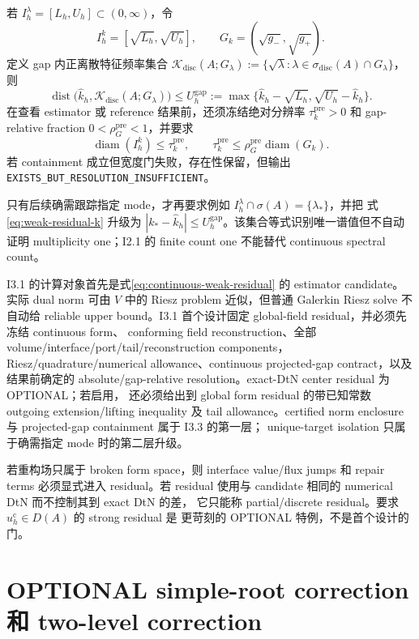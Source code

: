 \documentclass[UTF8,fontset=fandol,11pt,a4paper]{ctexart}
\begin{document}
若 $I_h^\lambda=[L_h,U_h]\subset(0,\infty)$，令
\[
  I_h^k=[\sqrt{L_h},\sqrt{U_h}],
  \qquad
  G_k=(\sqrt{g_-},\sqrt{g_+}).
\]
定义 gap 内正离散特征频率集合
$\mathcal K_{\mathrm{disc}}(A;G_\lambda)
:=\{\sqrt{\lambda}:\lambda\in\sigma_{\mathrm{disc}}(A)\cap G_\lambda\}$，则
\begin{equation}
  \operatorname{dist}\bigl(
    \widehat k_h,\mathcal K_{\mathrm{disc}}(A;G_\lambda)
  \bigr)
  \le
  U_h^{\mathrm{gap}}
  :=
  \max\{\widehat k_h-\sqrt{L_h},
         \sqrt{U_h}-\widehat k_h\}.
  \label{eq:weak-residual-k}
\end{equation}
在查看 estimator 或 reference 结果前，还须冻结绝对分辨率
$\tau_k^{\mathrm{pre}}>0$ 和 gap-relative fraction
$0<\rho_G^{\mathrm{pre}}<1$，并要求
\[
  \operatorname{diam}(I_h^k)\le\tau_k^{\mathrm{pre}},
  \qquad
  \tau_k^{\mathrm{pre}}
  \le\rho_G^{\mathrm{pre}}\operatorname{diam}(G_k).
\]
若 containment 成立但宽度门失败，存在性保留，但输出
\texttt{EXISTS\_BUT\_RESOLUTION\_INSUFFICIENT}。

只有后续确需跟踪指定 mode，才再要求例如
$I_h^\lambda\cap\sigma(A)=\{\lambda_*\}$，并把
式\eqref{eq:weak-residual-k} 升级为
$|k_*-\widehat k_h|\le U_h^{\mathrm{gap}}$。该集合等式识别唯一谱值但不自动证明
multiplicity one；I2.1 的 finite count one 不能替代 continuous spectral count。

I3.1 的计算对象首先是式\eqref{eq:continuous-weak-residual} 的 estimator candidate。实际
dual norm 可由 $V$ 中的 Riesz problem 近似，但普通 Galerkin Riesz solve 不自动给 reliable
upper bound。I3.1 首个设计固定 global-field residual，并必须先冻结 continuous form、
conforming field reconstruction、全部 volume/interface/port/tail/reconstruction components，
Riesz/quadrature/numerical allowance、continuous projected-gap contract，以及结果前确定的
absolute/gap-relative resolution。exact-DtN center residual 为 OPTIONAL；若启用，
还必须给出到 global form residual 的带已知常数 outgoing extension/lifting inequality 及
tail allowance。certified norm enclosure 与 projected-gap containment 属于 I3.3 的第一层；
unique-target isolation 只属于确需指定 mode 时的第二层升级。

若重构场只属于 broken form space，则 interface value/flux jumps 和 repair terms 必须显式进入
residual。若 residual 使用与 candidate 相同的 numerical DtN 而不控制其到 exact DtN 的差，
它只能称 partial/discrete residual。要求 $u_h^{\mathrm c}\in D(A)$ 的 strong residual 是
更苛刻的 OPTIONAL 特例，不是首个设计的门。

\section{OPTIONAL simple-root correction 和 two-level correction}
\end{document}
